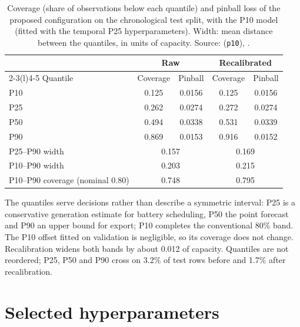 \begin{table}[H]
\centering
\caption{Coverage (share of observations below each quantile) and pinball loss of the proposed configuration on the chronological test split, with the P10 model (fitted with the temporal P25 hyperparameters). Width: mean distance between the quantiles, in units of capacity. Source:  (\texttt{p10}), .}
\label{tab:s-p10}
\small
\begin{tabular}{@{}l c c c c@{}}
\toprule
 & \multicolumn{2}{c}{Raw} & \multicolumn{2}{c}{Recalibrated} \\
\cmidrule(lr){2-3}\cmidrule(l){4-5}
Quantile & Coverage & Pinball & Coverage & Pinball \\
\midrule
P10 & 0.125 & 0.0156 & 0.125 & 0.0156 \\
P25 & 0.262 & 0.0274 & 0.272 & 0.0274 \\
P50 & 0.494 & 0.0338 & 0.531 & 0.0339 \\
P90 & 0.869 & 0.0153 & 0.916 & 0.0152 \\
\midrule
P25--P90 width & \multicolumn{2}{c}{0.157} & \multicolumn{2}{c}{0.169} \\
P10--P90 width & \multicolumn{2}{c}{0.203} & \multicolumn{2}{c}{0.215} \\
P10--P90 coverage (nominal 0.80) & \multicolumn{2}{c}{0.748} & \multicolumn{2}{c}{0.795} \\
\bottomrule
\end{tabular}
\end{table}

The quantiles serve decisions rather than describe a symmetric interval: P25 is a conservative generation estimate for battery scheduling, P50 the point forecast and P90 an upper bound for export; P10 completes the conventional 80\% band. The P10 offset fitted on validation is negligible, so its coverage does not change. Recalibration widens both bands by about 0.012 of capacity. Quantiles are not reordered; P25, P50 and P90 cross on 3.2\% of test rows before and 1.7\% after recalibration.

\section{Selected hyperparameters}
\label{sec:s-hparams}

